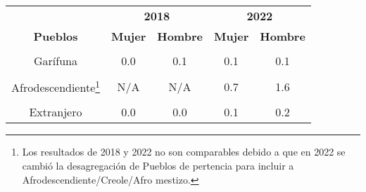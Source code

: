 \begin{tabular}[t]{ccccc}
\toprule
\multicolumn{1}{c}{\textbf{ }} & \multicolumn{2}{c}{\textbf{2018}} & \multicolumn{2}{c}{\textbf{2022}} \\
\cmidrule(l{3pt}r{3pt}){2-3} \cmidrule(l{3pt}r{3pt}){4-5}
\textbf{Pueblos} & \textbf{Mujer} & \textbf{Hombre} & \textbf{Mujer} & \textbf{Hombre}\\
\midrule
\cellcolor[HTML]{B6B3FF}{Maya} & \cellcolor[HTML]{B6B3FF}{10.7} & \cellcolor[HTML]{B6B3FF}{23.5} & \cellcolor[HTML]{B6B3FF}{11.6} & \cellcolor[HTML]{B6B3FF}{22.5}\\
Garífuna & 0.0 & 0.1 & 0.1 & 0.1\\
\cellcolor[HTML]{B6B3FF}{Xinka} & \cellcolor[HTML]{B6B3FF}{0.4} & \cellcolor[HTML]{B6B3FF}{1.4} & \cellcolor[HTML]{B6B3FF}{0.4} & \cellcolor[HTML]{B6B3FF}{0.8}\\
Afrodescendiente\footnote{Los resultados de 2018 y 2022 no son comparables debido a que en 2022 se cambió la desagregación de Pueblos de pertencia para incluir a Afrodescendiente/Creole/Afro mestizo.} & N/A & N/A & 0.7 & 1.6\\
\cellcolor[HTML]{B6B3FF}{Ladino} & \cellcolor[HTML]{B6B3FF}{22.8} & \cellcolor[HTML]{B6B3FF}{41.1} & \cellcolor[HTML]{B6B3FF}{24.8} & \cellcolor[HTML]{B6B3FF}{37.2}\\
Extranjero & 0.0 & 0.0 & 0.1 & 0.2\\
\bottomrule
\end{tabular}
